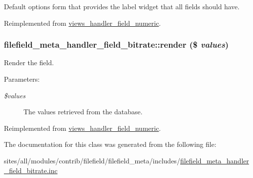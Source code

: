 Default options form that provides the label widget that all fields should have. 

Reimplemented from \hyperlink{classviews__handler__field__numeric_e6f81d1896ece64e9450ebc2d60da2fd}{views\_\-handler\_\-field\_\-numeric}.\hypertarget{classfilefield__meta__handler__field__bitrate_8b49b6ccdf60cd91f344b3d781cdd51c}{
\subsubsection[{render}]{\setlength{\rightskip}{0pt plus 5cm}filefield\_\-meta\_\-handler\_\-field\_\-bitrate::render (\$ {\em values})}}
\label{classfilefield__meta__handler__field__bitrate_8b49b6ccdf60cd91f344b3d781cdd51c}


Render the field.

\begin{Desc}
\item[Parameters:]
\begin{description}
\item[{\em \$values}]The values retrieved from the database. \end{description}
\end{Desc}


Reimplemented from \hyperlink{classviews__handler__field__numeric_9c76aeef951c45385fd91a22e5e656aa}{views\_\-handler\_\-field\_\-numeric}.

The documentation for this class was generated from the following file:\begin{CompactItemize}
\item 
sites/all/modules/contrib/filefield/filefield\_\-meta/includes/\hyperlink{filefield__meta__handler__field__bitrate_8inc}{filefield\_\-meta\_\-handler\_\-field\_\-bitrate.inc}\end{CompactItemize}
